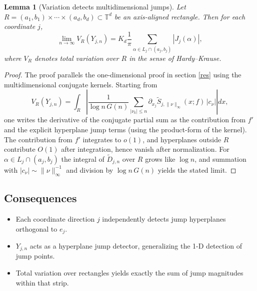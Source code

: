 \documentclass{amsart}
\newtheorem{lemma}[theorem]{Lemma}
\theoremstyle{definition}
\theoremstyle{remark}
\numberwithin{equation}{section}
\begin{document}
\begin{lemma}[Variation detects multidimensional jumps]
\label{lem:variation-hd}
Let \(R = (a_1,b_1)\times\cdots\times(a_d,b_d)\subset \mathbb{T}^d\) be an axis-aligned rectangle. Then for each coordinate \(j\),
\begin{equation*}
  \lim_{n\to\infty} V_R(Y_{j,n})
    = K_d\frac{1}{\pi}
      \sum_{\alpha\in L_j\cap(a_j,b_j)} |J_j(\alpha)|,
\end{equation*}
where \(V_R\) denotes total variation over \(R\) in the sense of Hardy--Krause.
\end{lemma}

\begin{proof}
The proof parallels the one-dimensional proof in section \ref{res} using the multidimensional conjugate kernels.
Starting from
\begin{equation*}
  V_R(Y_{j,n})
  =
  \int_R
  \left|
  \frac{1}{\log n\,G(n)}
  \sum_{|\nu_k|\le n}
  \partial_{x_j}\widetilde S_{j,\|\nu\|_\infty}(x;f)\,|c_\nu|
  \right|
  dx,
\end{equation*}
one writes the derivative of the conjugate partial sum as the contribution from \(f'\) and the explicit hyperplane jump terms
(using the product-form of the kernel). The contribution from \(f'\) integrates to \(o(1)\), and hyperplanes outside \(R\) contribute \(O(1)\) after integration, hence vanish after normalization. For \(\alpha\in L_j\cap(a_j,b_j)\) the integral of \(\widetilde D_{j,n}\) over \(R\) grows like \(\log n\), and summation with \(|c_\nu|\sim \|\nu\|_\infty^{-1}\) and division by \(\log n\,G(n)\) yields the stated limit.
\end{proof}

\subsection{Consequences}
\begin{itemize}
  \item Each coordinate direction \(j\) independently detects jump hyperplanes orthogonal to \(e_j\).
  \item \(Y_{j,n}\) acts as a hyperplane jump detector, generalizing the 1-D detection of jump points.
  \item Total variation over rectangles yields exactly the sum of jump magnitudes within that strip.
\end{itemize}



\end{document}
